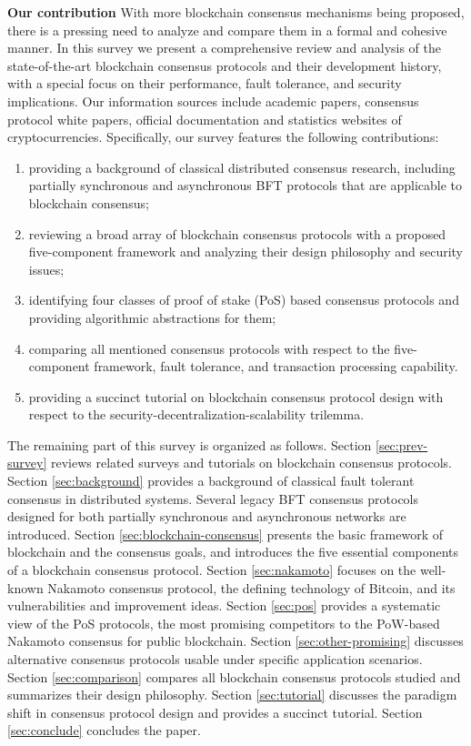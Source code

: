 \textbf{Our contribution} 
With more blockchain consensus mechanisms being proposed, there is a pressing need to analyze and compare them in a formal and cohesive manner.
In this survey we present a comprehensive review and analysis of the state-of-the-art blockchain consensus protocols and their development history, 
with a special focus on their performance, fault tolerance, and security implications. Our information sources include academic papers, consensus protocol white papers, official documentation and statistics websites of cryptocurrencies.
Specifically, our survey features the following contributions:
\begin{enumerate}
    \item providing a background of classical distributed consensus research, including partially synchronous and asynchronous BFT protocols that are applicable to blockchain consensus;
    \item {\color{\rcolor}
     reviewing a broad array of blockchain consensus protocols with a proposed five-component framework and analyzing their design philosophy and security issues;}
    \item identifying four classes of proof of stake (PoS) based consensus protocols and providing algorithmic abstractions for them;
    \item comparing all mentioned consensus protocols with respect to the five-component framework, fault tolerance, and transaction processing capability.
    \item {\color{\rcolor}providing a succinct tutorial on blockchain consensus protocol design with respect to the security-decentralization-scalability trilemma.}
\end{enumerate}
The remaining part of this survey is organized as follows. 
Section \ref{sec:prev-survey} reviews related surveys and tutorials on blockchain consensus protocols.
Section \ref{sec:background} provides a background of classical fault tolerant consensus in distributed systems. Several legacy BFT consensus protocols designed for both partially synchronous and asynchronous networks are introduced. 
Section \ref{sec:blockchain-consensus} presents the basic framework of blockchain and the consensus goals, and introduces the five essential components of a blockchain consensus protocol. 
Section \ref{sec:nakamoto} focuses on the well-known Nakamoto consensus protocol, the defining technology of Bitcoin, and its vulnerabilities and improvement ideas.
Section \ref{sec:pos} provides a systematic view of the PoS protocols, the most promising competitors to the PoW-based Nakamoto consensus for public blockchain. 
Section \ref{sec:other-promising} discusses alternative consensus protocols usable under specific application scenarios. 
Section \ref{sec:comparison} compares all blockchain consensus protocols studied and summarizes their design philosophy.
Section \ref{sec:tutorial} discusses the paradigm shift in consensus protocol design and provides a succinct tutorial.
Section \ref{sec:conclude} concludes the paper.

